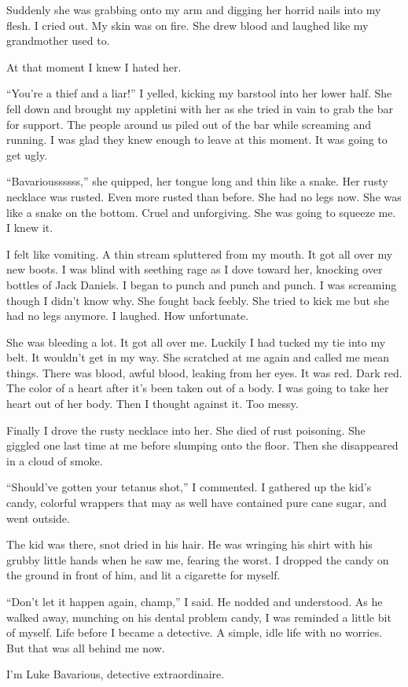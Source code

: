 Suddenly she was grabbing onto my arm and digging her horrid nails
into my flesh. I cried out. My skin was on fire. She drew blood and
laughed like my grandmother used to.

At that moment I knew I hated her.



``You're a thief and a liar!'' I yelled, kicking my
barstool into her lower half. She fell down and brought my
appletini with her as she tried in vain to grab the bar for
support. The people around us piled out of the bar while screaming
and running. I was glad they knew enough to leave at this moment.
It was going to get ugly.

``Bavarioussssss,'' she quipped, her tongue long and thin
like a snake. Her rusty necklace was rusted. Even more rusted than
before. She had no legs now. She was like a snake on the bottom.
Cruel and unforgiving. She was going to squeeze me. I knew
it.



I felt like vomiting. A thin stream spluttered from my mouth. It
got all over my new boots. I was blind with seething rage as I dove
toward her, knocking over bottles of Jack Daniels. I began to punch
and punch and punch. I was screaming though I didn't know
why. She fought back feebly. She tried to kick me but she had no
legs anymore. I laughed. How unfortunate.



She was bleeding a lot. It got all over me. Luckily I had tucked my
tie into my belt. It wouldn't get in my way. She scratched at
me again and called me mean things. There was blood, awful blood,
leaking from her eyes. It was red. Dark red. The color of a heart
after it's been taken out of a body. I was going to take her
heart out of her body. Then I thought against it. Too messy.



Finally I drove the rusty necklace into her. She died of rust
poisoning. She giggled one last time at me before slumping onto the
floor. Then she disappeared in a cloud of smoke.

``Should've gotten your tetanus shot,'' I
commented. I gathered up the kid's candy, colorful wrappers
that may as well have contained pure cane sugar, and went
outside.



The kid was there, snot dried in his hair. He was wringing his
shirt with his grubby little hands when he saw me, fearing the
worst. I dropped the candy on the ground in front of him, and lit a
cigarette for myself.

``Don't let it happen again, champ,'' I said. He
nodded and understood. As he walked away, munching on his dental
problem candy, I was reminded a little bit of myself. Life before I
became a detective. A simple, idle life with no worries. But that
was all behind me now.



I'm Luke Bavarious, detective extraordinaire. 

 



